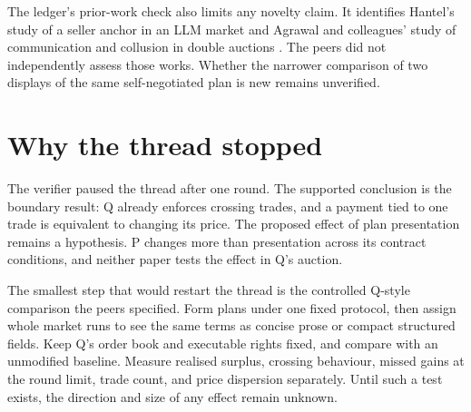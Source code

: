 \documentclass{article}
\begin{document}
The ledger's prior-work check also limits any novelty claim. It identifies Hantel's study of a
seller anchor in an LLM market \cite{Hantel2026} and Agrawal and colleagues' study of communication
and collusion in double auctions \cite{Agrawal2025}. The peers did not independently assess those
works. Whether the narrower comparison of two displays of the same self-negotiated plan is new
remains unverified.

\section{Why the thread stopped}

The verifier paused the thread after one round. The supported conclusion is the boundary result: Q
already enforces crossing trades, and a payment tied to one trade is equivalent to changing its
price. The proposed effect of plan presentation remains a hypothesis. P changes more than
presentation across its contract conditions, and neither paper tests the effect in Q's auction.

The smallest step that would restart the thread is the controlled Q-style comparison the peers
specified. Form plans under one fixed protocol, then assign whole market runs to see the same terms
as concise prose or compact structured fields. Keep Q's order book and executable rights fixed, and
compare with an unmodified baseline. Measure realised surplus, crossing behaviour, missed gains at
the round limit, trade count, and price dispersion separately. Until such a test exists, the
direction and size of any effect remain unknown.



\end{document}
